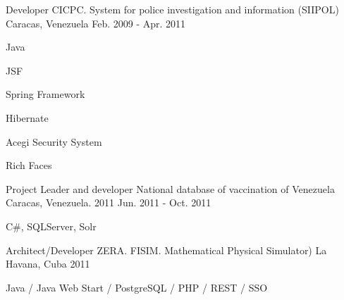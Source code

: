 


\begin{cventries}


\cventry
{Developer} %
{CICPC. System for police investigation and information (SIIPOL)} %
{Caracas, Venezuela} %
{Feb. 2009 - Apr. 2011} %
{ %
\begin{cvitems}
\item {Java}
\item {JSF}
\item {Spring Framework}
\item {Hibernate}
\item {Acegi Security System}
\item {Rich Faces}
\end{cvitems}
}


\cventry
{Project Leader and developer} %
{National database of vaccination of Venezuela} %
{Caracas, Venezuela. 2011} %
{Jun. 2011 - Oct. 2011} %
{ %
\begin{cvitems}
\item {C#, SQLServer, Solr}
\end{cvitems}
}


\cventry
{Architect/Developer} %
{ZERA. FISIM. Mathematical Physical Simulator)} %
{La Havana, Cuba} %
{2011} %
{ %
\begin{cvitems}
\item {Java / Java Web Start / PostgreSQL / PHP / REST / SSO}
\end{cvitems} 
}



\end{cventries}
